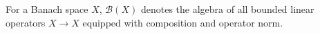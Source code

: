 
For a Banach space $X$, $\mathcal B(X)$ denotes the algebra of all bounded linear operators $X\to X$ equipped with composition and operator norm.
